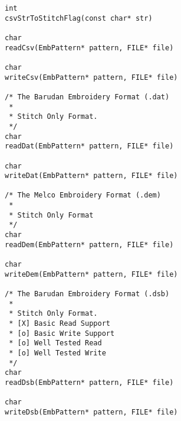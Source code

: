 \begin{lstlisting}
int
csvStrToStitchFlag(const char* str)

char
readCsv(EmbPattern* pattern, FILE* file)

char
writeCsv(EmbPattern* pattern, FILE* file)

/* The Barudan Embroidery Format (.dat)
 *
 * Stitch Only Format.
 */
char
readDat(EmbPattern* pattern, FILE* file)

char
writeDat(EmbPattern* pattern, FILE* file)

/* The Melco Embroidery Format (.dem)
 *
 * Stitch Only Format
 */
char
readDem(EmbPattern* pattern, FILE* file)

char
writeDem(EmbPattern* pattern, FILE* file)

/* The Barudan Embroidery Format (.dsb)
 *
 * Stitch Only Format.
 * [X] Basic Read Support
 * [o] Basic Write Support
 * [o] Well Tested Read
 * [o] Well Tested Write
 */
char
readDsb(EmbPattern* pattern, FILE* file)

char
writeDsb(EmbPattern* pattern, FILE* file)


\end{lstlisting}
